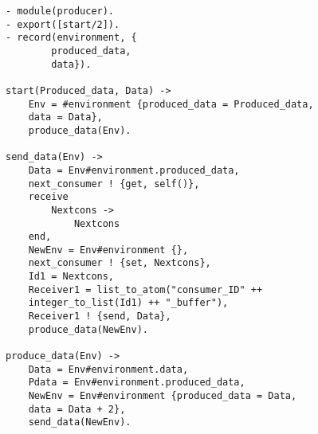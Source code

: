 \begin{verbatim}
- module(producer).
- export([start/2]).
- record(environment, {
        produced_data,
        data}).

start(Produced_data, Data) -> 
    Env = #environment {produced_data = Produced_data,
    data = Data},
    produce_data(Env).

send_data(Env) -> 
    Data = Env#environment.produced_data,
    next_consumer ! {get, self()},
    receive 
        Nextcons -> 
            Nextcons
    end,
    NewEnv = Env#environment {},
    next_consumer ! {set, Nextcons},
    Id1 = Nextcons,
    Receiver1 = list_to_atom("consumer_ID" ++
    integer_to_list(Id1) ++ "_buffer"),
    Receiver1 ! {send, Data},
    produce_data(NewEnv).

produce_data(Env) -> 
    Data = Env#environment.data,
    Pdata = Env#environment.produced_data,
    NewEnv = Env#environment {produced_data = Data,
    data = Data + 2},
    send_data(NewEnv).
\end{verbatim}
